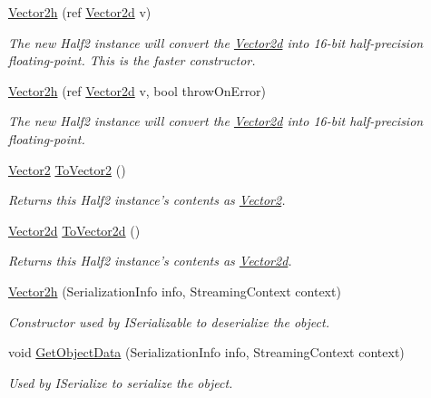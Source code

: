 \begin{DoxyCompactItemize}
\hyperlink{struct_open_t_k_1_1_vector2h_ac49060e5cc2e9e1079ea71e87bc61448}{Vector2h} (ref \hyperlink{struct_open_t_k_1_1_vector2d}{Vector2d} v)
\begin{DoxyCompactList}\small\item\em The new Half2 instance will convert the \hyperlink{struct_open_t_k_1_1_vector2d}{Vector2d} into 16-\/bit half-\/precision floating-\/point. This is the faster constructor. \end{DoxyCompactList}\item 
\hyperlink{struct_open_t_k_1_1_vector2h_ae0f52373b2aa6c49e9b434965cc84bdd}{Vector2h} (ref \hyperlink{struct_open_t_k_1_1_vector2d}{Vector2d} v, bool throw\-On\-Error)
\begin{DoxyCompactList}\small\item\em The new Half2 instance will convert the \hyperlink{struct_open_t_k_1_1_vector2d}{Vector2d} into 16-\/bit half-\/precision floating-\/point. \end{DoxyCompactList}\item 
\hyperlink{struct_open_t_k_1_1_vector2}{Vector2} \hyperlink{struct_open_t_k_1_1_vector2h_a832ec249ee543cbb791e870d94d5b34a}{To\-Vector2} ()
\begin{DoxyCompactList}\small\item\em Returns this Half2 instance's contents as \hyperlink{struct_open_t_k_1_1_vector2}{Vector2}. \end{DoxyCompactList}\item 
\hyperlink{struct_open_t_k_1_1_vector2d}{Vector2d} \hyperlink{struct_open_t_k_1_1_vector2h_a36e822a9f703e1d0de939c23e5de0c52}{To\-Vector2d} ()
\begin{DoxyCompactList}\small\item\em Returns this Half2 instance's contents as \hyperlink{struct_open_t_k_1_1_vector2d}{Vector2d}. \end{DoxyCompactList}\item 
\hyperlink{struct_open_t_k_1_1_vector2h_a8b3983473ffb93559239bc2e1e636c96}{Vector2h} (Serialization\-Info info, Streaming\-Context context)
\begin{DoxyCompactList}\small\item\em Constructor used by I\-Serializable to deserialize the object.\end{DoxyCompactList}\item 
void \hyperlink{struct_open_t_k_1_1_vector2h_aa838b7b16dabd197806c57c8cb1ef428}{Get\-Object\-Data} (Serialization\-Info info, Streaming\-Context context)
\begin{DoxyCompactList}\small\item\em Used by I\-Serialize to serialize the object.\end{DoxyCompactList}\item 

\end{DoxyCompactItemize}
